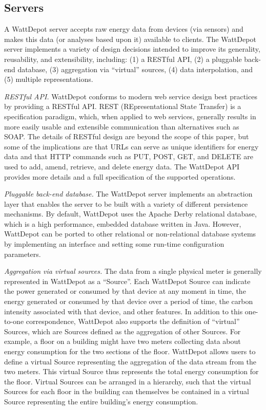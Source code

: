 \documentclass[conference]{IEEEtran}
\begin{document}
\subsection{Servers}

A WattDepot server accepts raw energy data from devices (via sensors) and
makes this data (or analyses based upon it) available to clients.  The
WattDepot server implements a variety of design decisions intended to
improve its generality, reusability, and extensibility, including: (1) a
RESTful API, (2) a pluggable back-end database, (3) aggregation via
``virtual'' sources, (4) data interpolation, and (5) multiple
representations.

{\em RESTful API.} WattDepot conforms to modern web service design best
practices by providing a RESTful API.  REST (REpresentational State
Transfer) \cite{REST} is a specification paradigm, which, when applied to
web services, generally results in more easily usable and extensible
communication than alternatives such as SOAP. The details of RESTful design
are beyond the scope of this paper, but some of the implications are that
URLs can serve as unique identifiers for energy data and that HTTP commands
such as PUT, POST, GET, and DELETE are used to add, amend, retrieve, and
delete energy data. The WattDepot API \cite{WattDepotAPI} provides more
details and a full specification of the supported operations.

{\em Pluggable back-end database.} The WattDepot server implements an
abstraction layer that enables the server to be built with a variety of
different persistence mechanisms.  By default, WattDepot uses the Apache
Derby relational database, which is a high performance, embedded database
written in Java.  However, WattDepot can be ported to other relational or
non-relational database systems by implementing an interface and setting some 
run-time configuration parameters. 

{\em Aggregation via virtual sources.} The data from a single physical
meter is generally represented in WattDepot as a ``Source''.  Each
WattDepot Source can indicate the power generated or consumed by that
device at any moment in time, the energy generated or consumed by that
device over a period of time, the carbon intensity associated with that
device, and other features.  In addition to this one-to-one correspondence,
WattDepot also supports the definition of ``virtual'' Sources, which are
Sources defined as the aggregation of other Sources.  For example, a floor
on a building might have two meters collecting data about energy
consumption for the two sections of the floor.  WattDepot allows users to
define a virtual Source representing the aggregation of the data stream
from the two meters.  This virtual Source thus represents the total energy
consumption for the floor. Virtual Sources can be arranged in a hierarchy,
such that the virtual Sources for each floor in the building can themselves
be contained in a virtual Source representing the entire building's energy
consumption.
\end{document}
